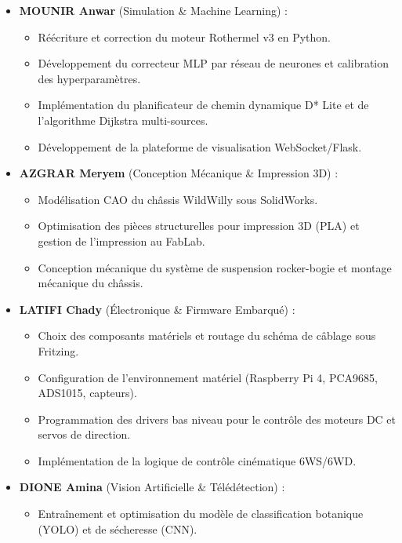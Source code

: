 \documentclass[a4paper,12pt,openany,titlepage]{scrartcl}
\begin{document}
\begin{itemize}
    \item \textbf{MOUNIR Anwar} (Simulation \& Machine Learning) :
        \begin{itemize}[nosep]
            \item Réécriture et correction du moteur Rothermel v3 en Python.
            \item Développement du correcteur MLP par réseau de neurones et calibration des hyperparamètres.
            \item Implémentation du planificateur de chemin dynamique D* Lite et de l'algorithme Dijkstra multi-sources.
            \item Développement de la plateforme de visualisation WebSocket/Flask.
        \end{itemize}
    \item \textbf{AZGRAR Meryem} (Conception Mécanique \& Impression 3D) :
        \begin{itemize}[nosep]
            \item Modélisation CAO du châssis WildWilly sous SolidWorks.
            \item Optimisation des pièces structurelles pour impression 3D (PLA) et gestion de l'impression au FabLab.
            \item Conception mécanique du système de suspension rocker-bogie et montage mécanique du châssis.
        \end{itemize}
    \item \textbf{LATIFI Chady} (Électronique \& Firmware Embarqué) :
        \begin{itemize}[nosep]
            \item Choix des composants matériels et routage du schéma de câblage sous Fritzing.
            \item Configuration de l'environnement matériel (Raspberry Pi 4, PCA9685, ADS1015, capteurs).
            \item Programmation des drivers bas niveau pour le contrôle des moteurs DC et servos de direction.
            \item Implémentation de la logique de contrôle cinématique 6WS/6WD.
        \end{itemize}
    \item \textbf{DIONE Amina} (Vision Artificielle \& Télédétection) :
        \begin{itemize}[nosep]
            \item Entraînement et optimisation du modèle de classification botanique (YOLO) et de sécheresse (CNN).

\end{itemize}
\end{itemize}
\end{document}
